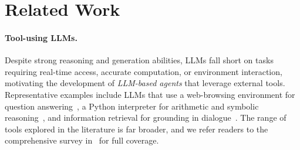 
\section{Related Work}
\label{sec:related_work}
\paragraph{Tool-using LLMs.} Despite strong reasoning and generation abilities, LLMs fall short on tasks requiring real-time access, accurate computation, or environment interaction, motivating the development of \emph{LLM-based agents} that leverage external tools. 
Representative examples include LLMs that use a web-browsing environment for question answering~\citep{nakano2022webgptbrowser}, a Python interpreter for arithmetic and symbolic reasoning~\citep{gao2023palprogramaidedlanguagemodels}, and information retrieval for grounding in dialogue~\citep{thoppilan2022lamdalanguagemodelsdialog}. 
The range of tools explored in the literature is far broader, and we refer readers to the comprehensive survey in~\citet{Qu_2025} for full coverage.


